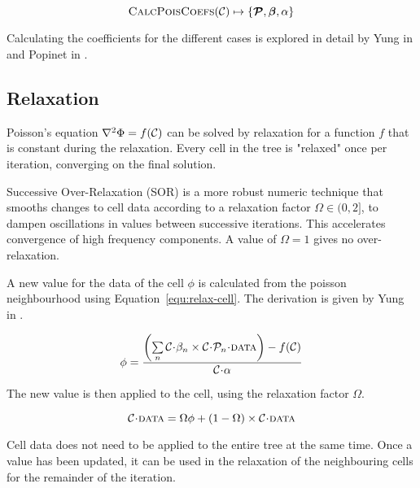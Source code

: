 \documentclass[twoside]{IIBproject}
\newcommand{\vect} [1] {\bm{#1}}
\newcommand{\acc}{{\mkern 0.5mu\cdot\mkern 0.5mu}}
\numberwithin{figure}{section}
\begin{document}
        \begin{equation}
            \label{fun:CalcPoisCoefs}
            \textproc{CalcPoisCoefs}(\mathcal{C}) \mapsto \{ \vect{\mathcal{P}}, \vect{\beta}, \alpha \}
        \end{equation}

        Calculating the coefficients for the different cases is explored in detail by Yung in \cite{Yung2010} and Popinet in \cite{pop03}. 



    \subsection{Relaxation} %
        \label{sec:relaxation}

        Poisson's equation $\laplacian{\Phi}=f(\mathcal{C})$ can be solved by relaxation for a function $f$ that is constant during the relaxation. Every cell in the tree is "relaxed" once per iteration, converging on the final solution. 

        Successive Over-Relaxation (SOR) is a more robust numeric technique that smooths changes to cell data according to a relaxation factor $\Omega \in (0,2]$, to dampen oscillations in values between successive iterations. This accelerates convergence of high frequency components. A value of $\Omega=1$ gives no over-relaxation. 

        A new value for the data of the cell $\phi$ is calculated from the poisson neighbourhood using Equation~\ref{equ:relax-cell}. The derivation is given by Yung in \cite{Yung2010}.

        \begin{equation}
            \phi = \frac{ \left( \sum\limits_n \mathcal{C}\acc\beta_n \times \mathcal{C}\acc\mathcal{P}_n\acc\textproc{data} \right)-f(\mathcal{C})} { \mathcal{C}\acc\alpha }
            \label{equ:relax-cell}
        \end{equation}

        The new value is then applied to the cell, using the relaxation factor $\Omega$. 

        \begin{equation}
            \mathcal{C}\acc\textproc{data} = \Omega\phi + (1-\Omega)\times\mathcal{C}\acc\textproc{data}
        \end{equation}

        Cell data does not need to be applied to the entire tree at the same time. Once a value has been updated, it can be used in the relaxation of the neighbouring cells for the remainder of the iteration. 
\end{document}

